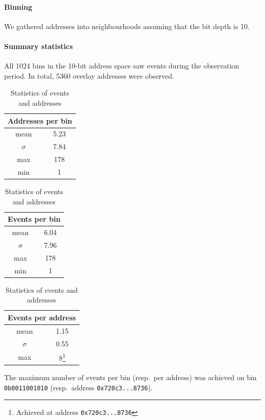 \paragraph{Binning} We gathered addresses into neighbourhoods assuming that the bit depth is 10.

\paragraph{Summary statistics}
All 1024 bins in the 10-bit address space saw events during the observation period.
%
In total, 5360 overlay addresses were observed.

\begin{table}
  \hfill
  \begin{tabular}{cc}
    \multicolumn{2}{l}{Addresses per bin} \\
    \toprule 
    mean      & 5.23 \\
    $\sigma$  & 7.84 \\
    max       & 178 \\
    min       & 1  \\
    \bottomrule
  \end{tabular}
  \hfill
  \begin{tabular}{cc}
    \multicolumn{2}{l}{Events per bin} \\
    \midrule 
    mean      & 6.04 \\
    $\sigma$  & 7.96 \\
    max       & 178 \\
    min       & 1 \\
    \bottomrule
  \end{tabular}
  \hfill
  \begin{tabular}{cc}
    \toprule
    \multicolumn{2}{l}{Events per address}\\
    \midrule
    mean      & 1.15 \\
    $\sigma$  & 0.55 \\
    max       & 8\footnote{Achieved at address {\tiny\texttt{0x720c3...8736}}}  \\
    \bottomrule
  \end{tabular}
  \hfill
  \caption{
    Statistics of events and addresses
  }  
\end{table}

The maximum number of events per bin (resp.~per address) was achieved on bin \texttt{0b0011001010} (resp.~address {\tiny\texttt{0x720c3...8736}}).

